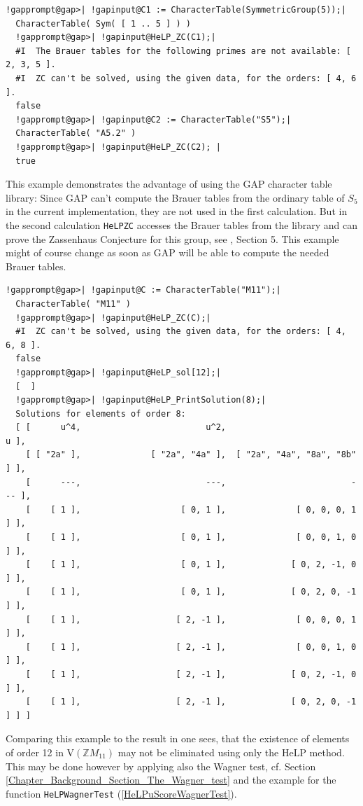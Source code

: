\documentclass[a4paper,11pt]{report}
\begin{document}
{{\begin{Verbatim}[commandchars=!@|,fontsize=\small,frame=single,label=Example]
  !gapprompt@gap>| !gapinput@C1 := CharacterTable(SymmetricGroup(5));|
  CharacterTable( Sym( [ 1 .. 5 ] ) )
  !gapprompt@gap>| !gapinput@HeLP_ZC(C1);|
  #I  The Brauer tables for the following primes are not available: [ 2, 3, 5 ].
  #I  ZC can't be solved, using the given data, for the orders: [ 4, 6 ].
  false
  !gapprompt@gap>| !gapinput@C2 := CharacterTable("S5");|
  CharacterTable( "A5.2" )
  !gapprompt@gap>| !gapinput@HeLP_ZC(C2); |
  true
\end{Verbatim}
 This example demonstrates the advantage of using the GAP character table
library: Since GAP can't compute the Brauer tables from the ordinary table of $S_5$ in the current implementation, they are not used in the first calculation. But
in the second calculation \texttt{HeLP{\textunderscore}ZC} accesses the Brauer tables from the library and can prove the Zassenhaus
Conjecture for this group, see \cite{HertweckBrauer}, Section 5. This example might of course change as soon as GAP will be able
to compute the needed Brauer tables. 
\begin{Verbatim}[commandchars=!@|,fontsize=\small,frame=single,label=Example]
  !gapprompt@gap>| !gapinput@C := CharacterTable("M11");|
  CharacterTable( "M11" )
  !gapprompt@gap>| !gapinput@HeLP_ZC(C);|
  #I  ZC can't be solved, using the given data, for the orders: [ 4, 6, 8 ].
  false
  !gapprompt@gap>| !gapinput@HeLP_sol[12];|
  [  ]
  !gapprompt@gap>| !gapinput@HeLP_PrintSolution(8);|
  Solutions for elements of order 8:
  [ [      u^4,                         u^2,                           u ],
    [ [ "2a" ],              [ "2a", "4a" ],  [ "2a", "4a", "8a", "8b" ] ],
    [      ---,                         ---,                         --- ],
    [    [ 1 ],                    [ 0, 1 ],              [ 0, 0, 0, 1 ] ],
    [    [ 1 ],                    [ 0, 1 ],              [ 0, 0, 1, 0 ] ],
    [    [ 1 ],                    [ 0, 1 ],             [ 0, 2, -1, 0 ] ],
    [    [ 1 ],                    [ 0, 1 ],             [ 0, 2, 0, -1 ] ],
    [    [ 1 ],                   [ 2, -1 ],              [ 0, 0, 0, 1 ] ],
    [    [ 1 ],                   [ 2, -1 ],              [ 0, 0, 1, 0 ] ],
    [    [ 1 ],                   [ 2, -1 ],             [ 0, 2, -1, 0 ] ],
    [    [ 1 ],                   [ 2, -1 ],             [ 0, 2, 0, -1 ] ] ]
\end{Verbatim}
 Comparing this example to the result in \cite{KonovalovM11} one sees, that the existence of elements of order 12 in $\mathrm{V}(\mathbb{Z}M_{11})$ may not be eliminated using only the HeLP method. This may be done however by
applying also the Wagner test, cf. Section \ref{Chapter_Background_Section_The_Wagner_test} and the example for the function \texttt{HeLP{\textunderscore}WagnerTest} (\ref{HeLPuScoreWagnerTest}).

}}
\end{document}
